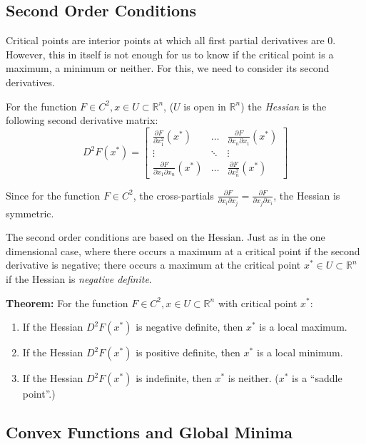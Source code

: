 \documentclass[11pt,]{article}
\providecommand{\tightlist}{%
  \setlength{\itemsep}{0pt}\setlength{\parskip}{0pt}}
\begin{document}
\subsection{Second Order Conditions}\label{second-order-conditions}

Critical points are interior points at which all first partial
derivatives are 0. However, this in itself is not enough for us to know
if the critical point is a maximum, a minimum or neither. For this, we
need to consider its second derivatives.

For the function \(F\in C^2, x\in U\subset \mathbb{R}^n\), (\(U\) is
open in \(\mathbb{R}^n\)) the \emph{Hessian} is the following second
derivative matrix: \[
D^2F(x^*) = \begin{bmatrix}
\frac{\partial F}{\partial x_1^2}(x^*) & \hdots &\frac{\partial F}{\partial x_n\partial x_1}(x^*)\\
\vdots & \ddots & \vdots\\
\frac{\partial F}{\partial x_1\partial x_n}(x^*) & \hdots & \frac{\partial F}{\partial x_n^2}(x^*)
\end{bmatrix}
\]

Since for the function \(F\in C^2\), the cross-partials
\(\frac{\partial F}{\partial x_i \partial x_j} = \frac{\partial F}{\partial x_j \partial x_i}\),
the Hessian is symmetric.

The second order conditions are based on the Hessian. Just as in the one
dimensional case, where there occurs a maximum at a critical point if
the second derivative is negative; there occurs a maximum at the
critical point \(x^*\in U\subset \mathbb{R}^n\) if the Hessian is
\emph{negative definite}.

\textbf{Theorem:} For the function
\(F\in C^2, x\in U\subset \mathbb{R}^n\) with critical point \(x^*\):

\begin{enumerate}
\def\labelenumi{\arabic{enumi}.}
\tightlist
\item
  If the Hessian \(D^2F(x^*)\) is negative definite, then \(x^*\) is a
  local maximum.
\item
  If the Hessian \(D^2F(x^*)\) is positive definite, then \(x^*\) is a
  local minimum.
\item
  If the Hessian \(D^2F(x^*)\) is indefinite, then \(x^*\) is neither.
  (\(x^*\) is a ``saddle point''.)
\end{enumerate}

\subsection{Convex Functions and Global
Minima}\label{convex-functions-and-global-minima}
\end{document}
